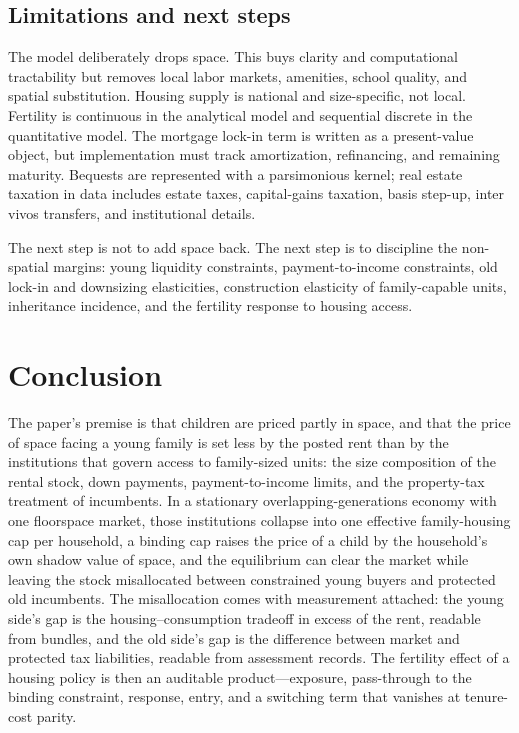 \documentclass[11pt]{article}
\newcommand{\1}{\mathbf 1}
\begin{document}
\subsection{Limitations and next steps}
\label{sec:quant_limits}

The model deliberately drops space. This buys clarity and computational tractability but removes local labor markets, amenities, school quality, and spatial substitution. Housing supply is national and size-specific, not local. Fertility is continuous in the analytical model and sequential discrete in the quantitative model. The mortgage lock-in term is written as a present-value object, but implementation must track amortization, refinancing, and remaining maturity. Bequests are represented with a parsimonious kernel; real estate taxation in data includes estate taxes, capital-gains taxation, basis step-up, inter vivos transfers, and institutional details.

The next step is not to add space back. The next step is to discipline the non-spatial margins: young liquidity constraints, payment-to-income constraints, old lock-in and downsizing elasticities, construction elasticity of family-capable units, inheritance incidence, and the fertility response to housing access.
\section{Conclusion}
\label{sec:conclusion}

The paper's premise is that children are priced partly in space, and that the price of space facing a young family is set less by the posted rent than by the institutions that govern access to family-sized units: the size composition of the rental stock, down payments, payment-to-income limits, and the property-tax treatment of incumbents. In a stationary overlapping-generations economy with one floorspace market, those institutions collapse into one effective family-housing cap per household, a binding cap raises the price of a child by the household's own shadow value of space, and the equilibrium can clear the market while leaving the stock misallocated between constrained young buyers and protected old incumbents. The misallocation comes with measurement attached: the young side's gap is the housing--consumption tradeoff in excess of the rent, readable from bundles, and the old side's gap is the difference between market and protected tax liabilities, readable from assessment records. The fertility effect of a housing policy is then an auditable product---exposure, pass-through to the binding constraint, response, entry, and a switching term that vanishes at tenure-cost parity.
\end{document}
